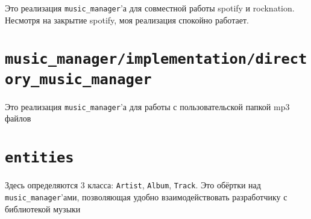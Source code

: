 Это реализация \texttt{music\_manager}'а для совместной работы spotify и rocknation.  Несмотря на закрытие spotify, моя реализация спокойно работает.

\section*{\texttt{music\_manager/implementation/directory\_music\_manager}}

Это реализация \texttt{music\_manager}'а для работы с пользовательской папкой mp3 файлов

\section*{\texttt{entities}}

Здесь определяются 3 класса: \texttt{Artist}, \texttt{Album}, \texttt{Track}.  Это обёртки над \texttt{music\_manager}'ами, позволяющая удобно взаимодействовать разработчику с библиотекой музыки